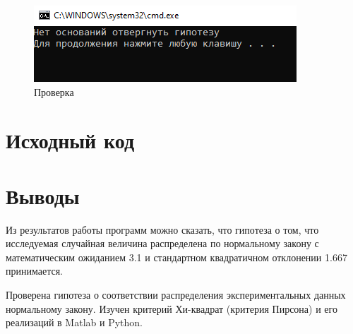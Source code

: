 \documentclass[a4paper,14pt]{article}
\begin{document}
\begin{figure}[H] %
	\centering
	\includegraphics{img2.png} %
	\caption{Проверка}
\end{figure}

\section{Исходный код}


	
\section{Выводы}

Из результатов работы программ можно сказать, что гипотеза о том, что исследуемая случайная величина распределена по нормальному закону с математическим ожиданием 3.1 и стандартном квадратичном отклонении 1.667 принимается. 
 
Проверена гипотеза о соответствии распределения экспериментальных данных нормальному закону. Изучен критерий Хи-квадрат (критерия Пирсона) и его реализаций в Matlab и Python.
\end{document}
